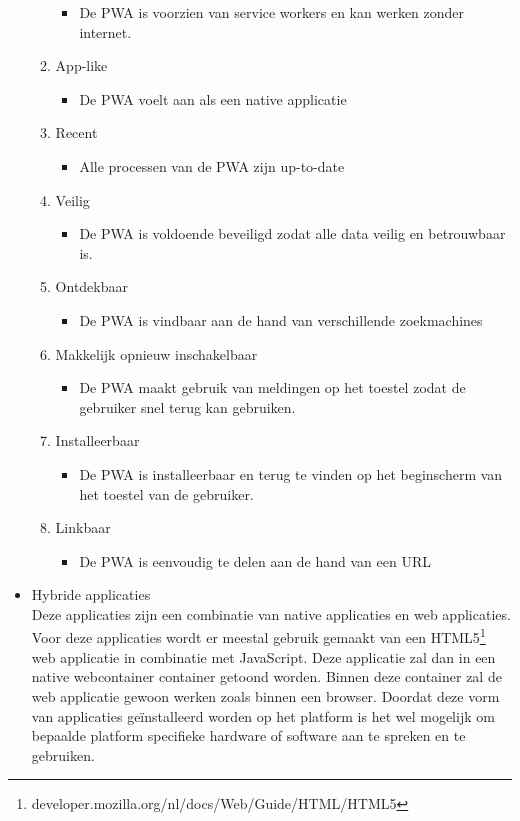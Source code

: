 \begin{itemize}
\begin{enumerate}
\begin{itemize}
           \item De PWA is voorzien van service workers en kan werken zonder internet.
       \end{itemize}
       \item App-like
       \begin{itemize}
           \item De PWA voelt aan als een native applicatie
       \end{itemize}
       \item Recent
       \begin{itemize}
           \item Alle processen van de PWA zijn up-to-date 
       \end{itemize}
       \item Veilig
       \begin{itemize}
           \item De PWA is voldoende beveiligd zodat alle data veilig en betrouwbaar is.
       \end{itemize}
       \item Ontdekbaar
       \begin{itemize}
           \item De PWA is vindbaar aan de hand van verschillende zoekmachines
       \end{itemize}
       \item Makkelijk opnieuw inschakelbaar
       \begin{itemize}
           \item De PWA maakt gebruik van meldingen op het toestel zodat de gebruiker snel terug kan gebruiken.
       \end{itemize}
       \item Installeerbaar
       \begin{itemize}
           \item De PWA is installeerbaar en terug te vinden op het beginscherm van het toestel van de gebruiker.
       \end{itemize}
       \item Linkbaar
       \begin{itemize}
           \item De PWA is eenvoudig te delen aan de hand van een URL
       \end{itemize}
    \end{enumerate} 

    \item Hybride applicaties\\
    Deze applicaties zijn een combinatie van native applicaties en web applicaties. Voor deze applicaties wordt er meestal gebruik gemaakt van een HTML5\footnote{developer.mozilla.org/nl/docs/Web/Guide/HTML/HTML5} web applicatie in combinatie met JavaScript. Deze applicatie zal dan in een native webcontainer container getoond worden. Binnen deze container zal de web applicatie gewoon werken zoals binnen een browser. Doordat deze vorm van applicaties geïnstalleerd worden op het platform is het wel mogelijk om bepaalde platform specifieke hardware of software aan te spreken en te gebruiken.
    \\
    

\end{itemize}
